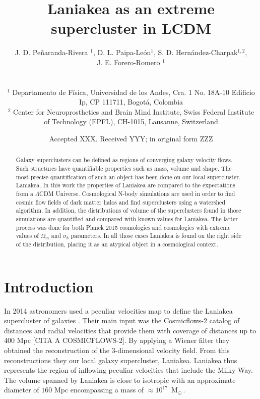 \documentclass[usenatbib]{mnras}
\title[Laniakea in a cosmological context]{Laniakea as an extreme supercluster in LCDM}
\author[Pe\~naranda-Rivera et al.]{
\parbox[t]{\textwidth}{
    {J. D. Pe\~naranda-Rivera $^1$,} 
    {D. L. Paipa-Le\'on$^{1}$,}
    {S. D. Hern\'andez-Charpak$^{1,2}$,}\\
    {J. E. Forero-Romero $^{1}$}
}
\\\\
$^{1}$ Departamento de F\'isica, Universidad de los Andes, Cra. 1
  No. 18A-10 Edificio Ip, CP 111711, Bogot\'a, Colombia \\
$^{2}$ Center for Neuroprosthetics and Brain Mind Institute, Swiss
  Federal Institute of Technology (EPFL), CH-1015, Lausanne,
  Switzerland\\  
}
\date{Accepted XXX. Received YYY; in original form ZZZ}
\newcommand{\Msun}{\,{\rm M}$_{\odot}$\,}
\begin{document}
\label{firstpage}
\pagerange{\pageref{firstpage}--\pageref{lastpage}}
\maketitle

\maketitle
\begin{abstract}
Galaxy superclusters can be defined as regions of converging galaxy
velocity flows. Such structures have quantifiable properties such as
mass, volume and shape. The most precise quantification of such an
object has been done on our local supercluster, Laniakea. In this work
the properties of Laniakea are compared to the expectations from a
$\Lambda$CDM Universe. Cosmological N-body simulations are used in
order to find cosmic flow fields of dark matter halos and find
superclusters using a watershed algorithm. In addition, the
distributions of volume of the superclusters found in those
simulations are quantified and compared with known values for
Laniakea. The latter process was done for both Planck 2015 cosmologies
and cosmologies with extreme values of $\Omega_m$ and $\sigma_8$
parameters. In all those cases Laniakea is found on the right side of
the distribution, placing it as an atypical object in a cosmological
context.  
\end{abstract}

\begin{keywords}
\end{keywords}




\section{Introduction}


In 2014 astronomers used a peculiar velocities map  to 
define the Laniakea supercluster of galaxies
\citep{2014Natur.513...71T}.  
Their main input was the Cosmicflows-2 catalog of distances and radial
velocities that provide them with coverage of distances up to 400 Mpc
[CITA A COSMICFLOWS-2]. 
By applying a Wiener filter \citep{Zaroubi_1999} they obtained the
reconstruction of the 3-dimensional velocity field. 
From this reconstructions they our local galaxy supercluster, Laniakea.
Laniakea thus represents the region of inflowing peculiar velocities
that include the Milky Way. 
The volume spanned by Laniakea is close to isotropic with an 
approximate diameter of $160$ Mpc encompassing a mass of
$\approx 10^{17}$ \Msun.
\end{document}
